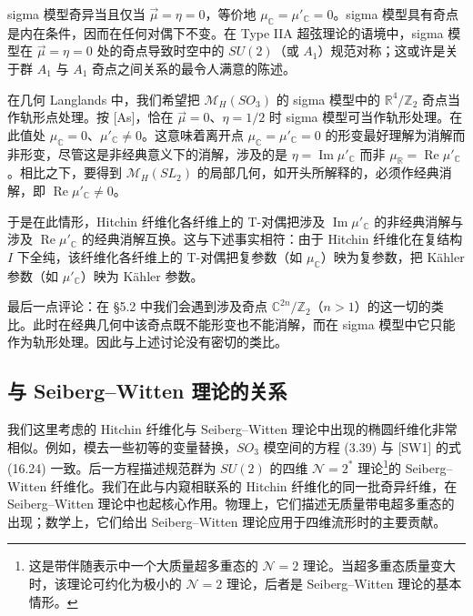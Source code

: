 sigma 模型奇异当且仅当 $\vec\mu=\eta=0$，等价地 $\mu_{\mathbb{C}}=\mu'_{\mathbb{C}}=0$。sigma 模型具有奇点是内在条件，因而在任何对偶下不变。在 Type IIA 超弦理论的语境中，sigma 模型在 $\vec\mu=\eta=0$ 处的奇点导致时空中的 $SU(2)$（或 $A_1$）规范对称；这或许是关于群 $A_1$ 与 $A_1$ 奇点之间关系的最令人满意的陈述。

在几何 Langlands 中，我们希望把 $\mathcal{M}_H(SO_3)$ 的 sigma 模型中的 $\mathbb{R}^4/\mathbb{Z}_2$ 奇点当作轨形点处理。按 [As]，恰在 $\vec\mu=0$、$\eta=1/2$ 时 sigma 模型可当作轨形处理。在此值处 $\mu_{\mathbb{C}}=0$、$\mu'_{\mathbb{C}}\ne0$。这意味着离开点 $\mu_{\mathbb{C}}=\mu'_{\mathbb{C}}=0$ 的形变最好理解为消解而非形变，尽管这是非经典意义下的消解，涉及的是 $\eta=\operatorname{Im}\mu'_{\mathbb{C}}$ 而非 $\mu_{\mathbb{R}}=\operatorname{Re}\mu'_{\mathbb{C}}$。相比之下，要得到 $\mathcal{M}_H(SL_2)$ 的局部几何，如开头所解释的，必须作经典消解，即 $\operatorname{Re}\mu'_{\mathbb{C}}\ne0$。

于是在此情形，Hitchin 纤维化各纤维上的 T-对偶把涉及 $\operatorname{Im}\mu'_{\mathbb{C}}$ 的非经典消解与涉及 $\operatorname{Re}\mu'_{\mathbb{C}}$ 的经典消解互换。这与下述事实相符：由于 Hitchin 纤维化在复结构 $I$ 下全纯，该纤维化各纤维上的 T-对偶把复参数（如 $\mu_{\mathbb{C}}$）映为复参数，把 Kähler 参数（如 $\mu'_{\mathbb{C}}$）映为 Kähler 参数。

最后一点评论：在 §5.2 中我们会遇到涉及奇点 $\mathbb{C}^{2n}/\mathbb{Z}_2$（$n>1$）的这一切的类比。此时在经典几何中该奇点既不能形变也不能消解，而在 sigma 模型中它只能作为轨形处理。因此与上述讨论没有密切的类比。

\subsection{与 Seiberg--Witten 理论的关系}

我们这里考虑的 Hitchin 纤维化与 Seiberg--Witten 理论中出现的椭圆纤维化非常相似。例如，模去一些初等的变量替换，$SO_3$ 模空间的方程 (3.39) 与 [SW1] 的式 (16.24) 一致。后一方程描述规范群为 $SU(2)$ 的四维 $\mathcal{N}=2^*$ 理论\footnote{这是带伴随表示中一个大质量超多重态的 $\mathcal{N}=2$ 理论。当超多重态质量变大时，该理论可约化为极小的 $\mathcal{N}=2$ 理论，后者是 Seiberg--Witten 理论的基本情形。}的 Seiberg--Witten 纤维化。我们在此与内窥相联系的 Hitchin 纤维化的同一批奇异纤维，在 Seiberg--Witten 理论中也起核心作用。物理上，它们描述无质量带电超多重态的出现；数学上，它们给出 Seiberg--Witten 理论应用于四维流形时的主要贡献。

